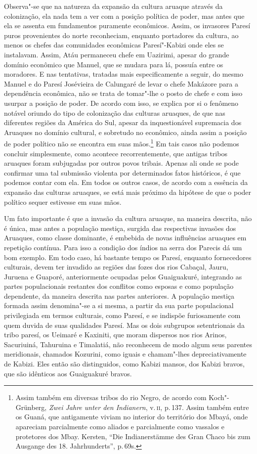 Observa"-se que na natureza da expansão da cultura aruaque através da
colonização, ela nada tem a ver com a posição política de poder, mas
antes que ela se assenta em fundamentos puramente econômicos. Assim, os
invasores Paresí puros provenientes do norte reconheciam, enquanto
portadores da cultura, ao menos os chefes das comunidades econômicas
Paresí"-Kabizi onde eles se instalavam. Assim, Atáu permaneceu chefe em
Uazirimi, apesar do grande domínio econômico que Manuel, que se mudara
para lá, possuía entre os moradores. E nas tentativas, tratadas mais
especificamente a seguir, do mesmo Manuel e do Paresí Josévieira de
Calungaré de levar o chefe Makázore para a dependência econômica, não se
trata de tomar"-lhe o posto de chefe e com isso usurpar a posição de
poder. De acordo com isso, se explica por si o fenômeno notável oriundo
do tipo de colonização das culturas aruaques, de que nas diferentes
regiões da América do Sul, apesar da inquestionável supremacia dos
Aruaques no domínio cultural, e sobretudo no econômico, ainda assim a
posição de poder político não se encontra em suas mãos.\footnote{Assim
  também em diversas tribos do rio Negro, de acordo com Koch"-Grünberg,
  \textit{Zwei Jahre unter den Indianern}, v.\,\textsc{ii}, p.\,137. Assim também
  entre os Guaná, que antigamente viviam no interior do território dos
  Mbayá, onde apareciam parcialmente como aliados e parcialmente como
  vassalos e protetores dos Mbay. Kersten, ``Die Indianerstämme des Gran
  Chaco bis zum Ausgange des 18. Jahrhunderts'', p.\,69s.} Em
tais casos não podemos concluir simplesmente, como acontece
recorrentemente, que antigas tribos aruaques foram subjugadas por outros
povos tribais. Apenas ali onde se pode confirmar uma tal submissão
violenta por determinados fatos históricos, é que podemos contar com
ela. Em todos os outros casos, de acordo com a essência da expansão das
culturas aruaques, se está mais próximo da hipótese de que o poder
político sequer estivesse em suas mãos.

Um fato importante é que a invasão da cultura aruaque, na maneira
descrita, não é única, mas antes a população mestiça, surgida das
respectivas invasões dos Aruaques, como classe dominante, é embebida de
novas influências aruaques em repetição contínua. Para isso a condição
dos índios na serra dos Parecis dá um bom exemplo. Em todo caso, há
bastante tempo os Paresí, enquanto fornecedores culturais, devem ter
invadido as regiões das fozes dos rios Cabaçal, Jauru, Juruena e
Guaporé, anteriormente ocupadas pelos Guaiguakuré, integrando as partes
populacionais restantes dos conflitos como esposas e como população
dependente, da maneira descrita nas partes anteriores. A população
mestiça formada assim denomina"-se a si mesma, a partir da sua parte
populacional privilegiada em termos culturais, como Paresí, e se
indispõe furiosamente com quem duvida de suas qualidades Paresí. Mas os
dois subgrupos setentrionais da tribo paresí, os Ueimaré e Kaxiniti, que
moram dispersos nos rios Arinos, Sacuriuiná, Tahuruina e Timalatiá, não
reconhecem de modo algum seus parentes meridionais, chamados Kozurini,
como iguais e chamam"-lhes depreciativamente de Kabizi. Eles então são
distinguidos, como Kabizi mansos, dos Kabizi bravos, que são idênticos
aos Guaiguakuré bravos.


